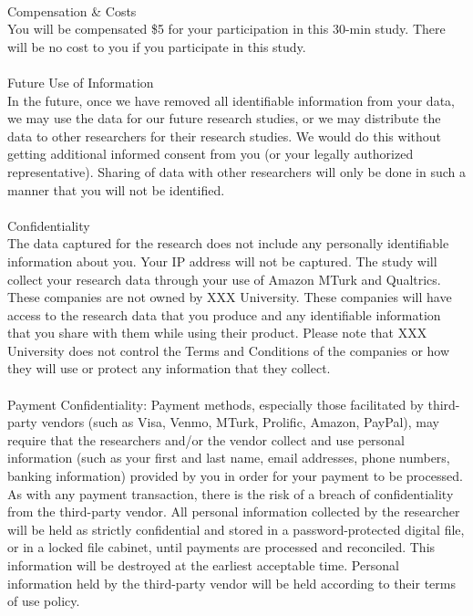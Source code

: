 \begin{figure*}[h]
{\begin{tcolorbox}[colback=gray!1, colframe=black!50, title=MTurk User Study Informed Consent:]
\\
Compensation \& Costs\\
You will be compensated \$5 for your participation in this 30-min study.
There will be no cost to you if you participate in this study.\\
\\
Future Use of Information\\
In the future, once we have removed all identifiable information from your data, we may use the data for our future research studies, or we may distribute the data to other researchers for their research studies.  We would do this without getting additional informed consent from you (or your legally authorized representative). Sharing of data with other researchers will only be done in such a manner that you will not be identified.\\
\\
Confidentiality\\
The data captured for the research does not include any personally identifiable information about you.  Your IP address will not be captured. The study will collect your research data through your use of Amazon MTurk and Qualtrics. These companies are not owned by XXX University. These companies will have access to the research data that you produce and any identifiable information that you share with them while using their product. Please note that XXX University does not control the Terms and Conditions of the companies or how they will use or protect any information that they collect.\\
\\
Payment Confidentiality: Payment methods, especially those facilitated by third-party vendors (such as Visa, Venmo, MTurk, Prolific, Amazon, PayPal), may require that the researchers and/or the vendor collect and use personal information (such as your first and last name, email addresses, phone numbers, banking information) provided by you in order for your payment to be processed. As with any payment transaction, there is the risk of a breach of confidentiality from the third-party vendor. All personal information collected by the researcher will be held as strictly confidential and stored in a password-protected digital file, or in a locked file cabinet, until payments are processed and reconciled. This information will be destroyed at the earliest acceptable time. Personal information held by the third-party vendor will be held according to their terms of use policy.\\
\\

\end{tcolorbox}}
\end{figure*}
